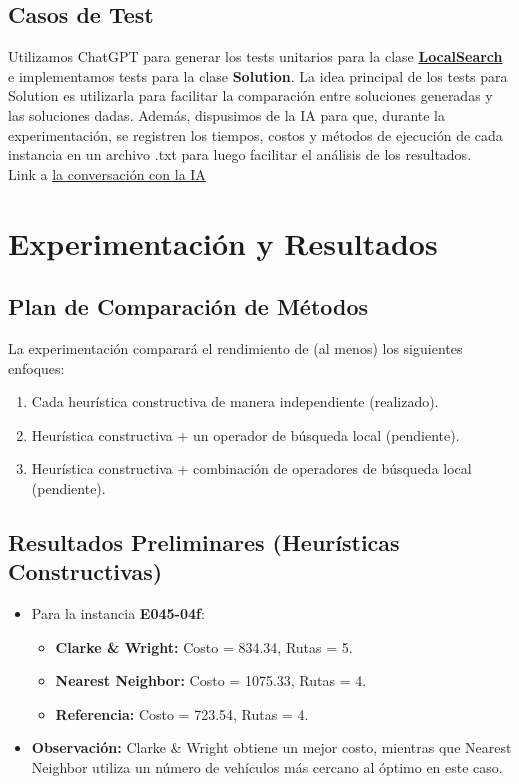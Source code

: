 \documentclass[a4paper,12pt]{article}
\begin{document}
\subsection{Casos de Test}
Utilizamos ChatGPT para generar los tests unitarios para la clase \href{https://chatgpt.com/share/686b99b7-38ac-800f-9b03-31634cc0b7de}{\textbf{LocalSearch}} e implementamos tests para la clase \textbf{Solution}. La idea principal de los tests para Solution es utilizarla para facilitar la comparación entre soluciones generadas y las soluciones dadas.
Además, dispusimos de la IA para que, durante la experimentación, se registren los tiempos, costos y métodos de ejecución de cada instancia en un archivo .txt para luego facilitar el análisis de los resultados.
\\ Link a \href{https://chatgpt.com/share/686d64a3-2a98-800f-a08d-ffff11d47fe8}{la conversación con la IA}

\section{Experimentación y Resultados}

\subsection{Plan de Comparación de Métodos}
La experimentación comparará el rendimiento de (al menos) los siguientes enfoques:
\begin{enumerate}
    \item Cada heurística constructiva de manera independiente (realizado).
    \item Heurística constructiva + un operador de búsqueda local (pendiente).
    \item Heurística constructiva + combinación de operadores de búsqueda local (pendiente).
\end{enumerate}

\subsection{Resultados Preliminares (Heurísticas Constructivas)}
\begin{itemize}
    \item Para la instancia \textbf{E045-04f}:
    \begin{itemize}
        \item \textbf{Clarke \& Wright:} Costo = 834.34, Rutas = 5.
        \item \textbf{Nearest Neighbor:} Costo = 1075.33, Rutas = 4.
        \item \textbf{Referencia:} Costo = 723.54, Rutas = 4.
    \end{itemize}
    \item \textbf{Observación:} Clarke \& Wright obtiene un mejor costo, mientras que Nearest Neighbor utiliza un número de vehículos más cercano al óptimo en este caso.
\end{itemize}
\end{document}

